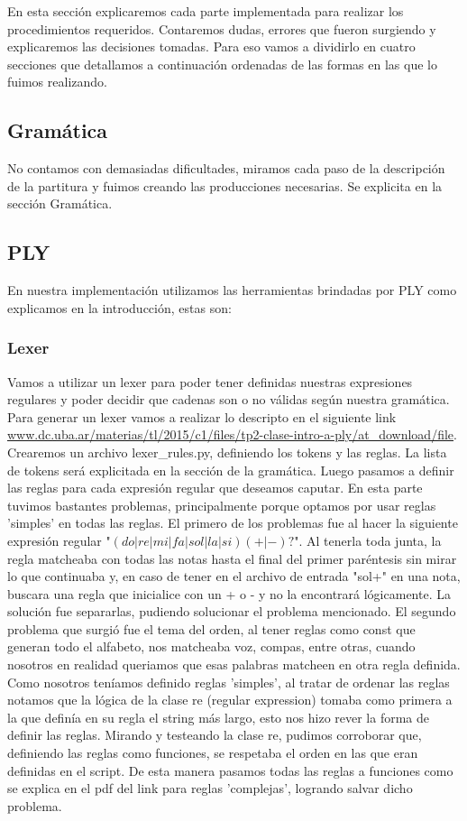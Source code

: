 En esta sección explicaremos cada parte implementada para realizar los procedimientos requeridos. Contaremos dudas, errores que fueron surgiendo y explicaremos las decisiones tomadas. Para eso vamos a dividirlo en cuatro secciones que detallamos a continuación ordenadas de las formas en las que lo fuimos realizando.

\subsection{Gramática}
No contamos con demasiadas dificultades, miramos cada paso de la descripción de la partitura y fuimos creando las producciones necesarias. Se explicita en la sección Gramática.

\subsection{PLY}
En nuestra implementación utilizamos las herramientas brindadas por PLY como explicamos en la introducción, estas son:
\subsubsection{Lexer}
Vamos a utilizar un lexer para poder tener definidas nuestras expresiones regulares y poder decidir que cadenas son o no válidas según nuestra gramática.
Para generar un lexer vamos a realizar lo descripto en el siguiente link \url{www.dc.uba.ar/materias/tl/2015/c1/files/tp2-clase-intro-a-ply/at_download/file}.
Crearemos un archivo lexer\_rules.py, definiendo los tokens y las reglas.
La lista de tokens será explicitada en la sección de la gramática.\newline
Luego pasamos a definir las reglas para cada expresión regular que deseamos caputar. En esta parte tuvimos bastantes problemas, principalmente porque optamos por usar reglas 'simples' en todas las reglas.\newline
El primero de los problemas fue al hacer la siguiente expresión regular "$(do|re|mi|fa|sol|la|si)(+|-)?$". Al tenerla toda junta, la regla matcheaba con todas las notas hasta el final del primer paréntesis sin mirar lo que continuaba y, en caso de tener en el archivo de entrada "sol+" en una nota, buscara una regla que inicialice con un + o - y no la encontrará lógicamente. La solución fue separarlas, pudiendo solucionar el problema mencionado. \newline
El segundo problema que surgió fue el tema del orden, al tener reglas como const que generan todo el alfabeto, nos matcheaba voz, compas, entre otras, cuando nosotros en realidad queriamos que esas palabras matcheen en otra regla definida. Como nosotros teníamos definido reglas 'simples', al tratar de ordenar las reglas notamos que la lógica de la clase re (regular expression) tomaba como primera a la que definía en su regla el string más largo, esto nos hizo rever la forma de definir las reglas. Mirando y testeando la clase re, pudimos corroborar que, definiendo las reglas como funciones, se respetaba el orden en las que eran definidas en el script. De esta manera pasamos todas las reglas a funciones como se explica en el pdf del link para reglas 'complejas', logrando salvar dicho problema.
